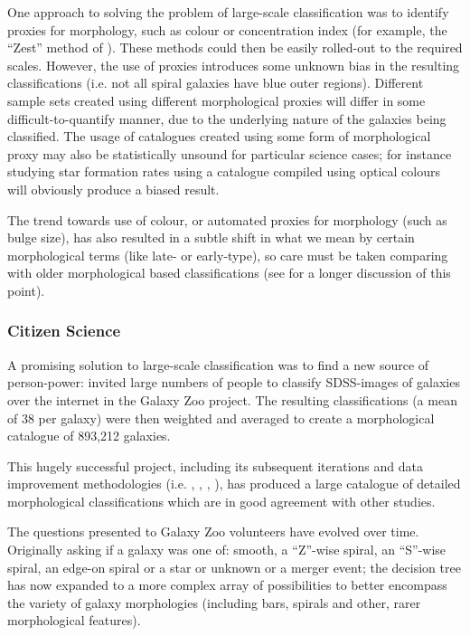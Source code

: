 \documentclass[../main.tex]{subfiles}
\begin{document}
One approach to solving the problem of large-scale classification was to identify proxies for morphology, such as colour or concentration index (for example, the ``Zest'' method of  \citet{Scarlata2007:astro-ph/0701746v2}). These methods could then be easily rolled-out to the required scales. However, the use of proxies introduces some unknown bias in the resulting classifications (i.e. not all spiral galaxies have blue outer regions). Different sample sets created using different morphological proxies will differ in some difficult-to-quantify manner, due to the underlying nature of the galaxies being classified. The usage of catalogues created using some form of morphological proxy may also be statistically unsound for particular science cases; for instance studying star formation rates using a catalogue compiled using optical colours will obviously produce a biased result.

The trend towards use of colour, or automated proxies for morphology (such as bulge size), has also resulted in a subtle shift in what we mean by certain morphological terms (like late- or early-type), so care must be taken comparing with older morphological based classifications (see \citealt{Masters2019:1904.11436v1} for a longer discussion of this point).

\subsubsection{Citizen Science}
A promising solution to large-scale classification was to find a new source of person-power: \cite{Lintott2008:0804.4483v1} invited large numbers of people to classify SDSS-images of galaxies over the internet in the Galaxy Zoo project. The resulting classifications (a mean of 38 per galaxy) were then weighted and averaged to create a morphological catalogue of 893,212 galaxies.

This hugely successful project, including its subsequent iterations and data improvement methodologies (i.e. \citealt{Willett2013:1308.3496v2}, \citealt{2017MNRAS.464.4176W}, \citealt{2017MNRAS.464.4420S}, \citealt{Hart2016:1607.01019v1}), has produced a large catalogue of detailed morphological classifications which are in good agreement with other studies.

The questions presented to Galaxy Zoo volunteers have evolved over time. Originally asking if a galaxy was one of: smooth, a ``Z''-wise spiral, an ``S''-wise spiral, an edge-on spiral or a star or unknown or a merger event; the decision tree has now expanded to a more complex array of possibilities to better encompass the variety of galaxy morphologies (including bars, spirals and other, rarer morphological features).
\end{document}
